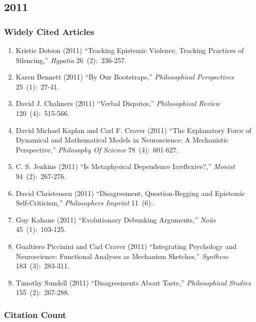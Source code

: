 \documentclass[
  10pt,
  letterpaper,
  DIV=11,
  numbers=noendperiod,
  twoside]{scrartcl}
\providecommand{\tightlist}{%
  \setlength{\itemsep}{0pt}\setlength{\parskip}{0pt}}\usepackage{longtable,booktabs,array}
\begin{document}
\newpage

\subsection{2011}\label{sec-s2011}

\subsubsection*{Widely Cited Articles}\label{widely-cited-articles-55}

\begin{enumerate}
\def\labelenumi{\arabic{enumi}.}
\tightlist
\item
  Kristie Dotson (2011) ``Tracking Epistemic Violence, Tracking
  Practices of Silencing,'' \emph{Hypatia} 26~(2):~236-257.
\item
  Karen Bennett (2011) ``By Our Bootstraps,'' \emph{Philosophical
  Perspectives} 25~(1):~27-41.
\item
  David J. Chalmers (2011) ``Verbal Disputes,'' \emph{Philosophical
  Review} 120~(4):~515-566.
\item
  David Michael Kaplan and Carl F. Craver (2011) ``The Explanatory Force
  of Dynamical and Mathematical Models in Neuroscience: A Mechanistic
  Perspective,'' \emph{Philosophy Of Science} 78~(4):~601-627.
\item
  C. S. Jenkins (2011) ``Is Metaphysical Dependence Irreflexive?,''
  \emph{Monist} 94~(2):~267-276.
\item
  David Christensen (2011) ``Disagreement, Question-Begging and
  Epistemic Self-Criticism,'' \emph{Philosophers Imprint} 11~(6):.
\item
  Guy Kahane (2011) ``Evolutionary Debunking Arguments,'' \emph{Noûs}
  45~(1):~103-125.
\item
  Gualtiero Piccinini and Carl Craver (2011) ``Integrating Psychology
  and Neuroscience: Functional Analyses as Mechanism Sketches,''
  \emph{Synthese} 183~(3):~283-311.
\item
  Timothy Sundell (2011) ``Disagreements About Taste,''
  \emph{Philosophical Studies} 155~(2):~267-288.
\end{enumerate}

\subsubsection*{Citation Count}\label{sec-count-2011}
\end{document}

